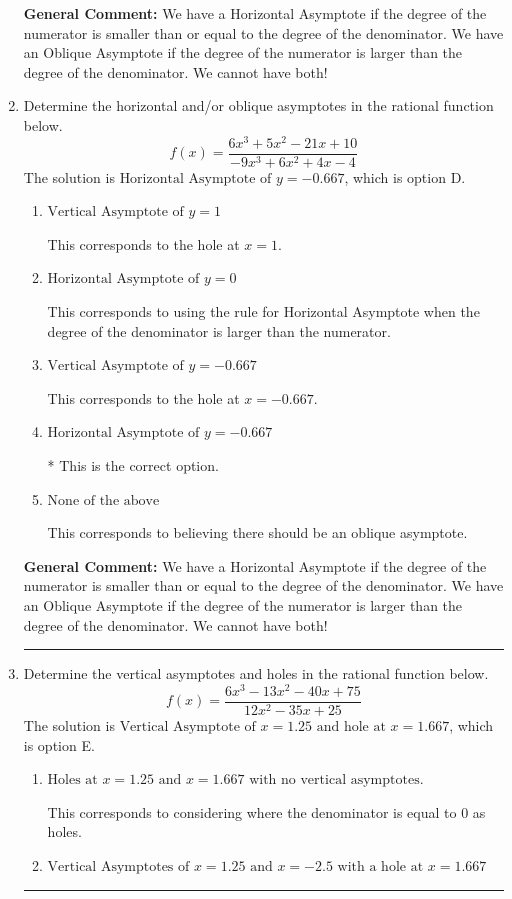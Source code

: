 \documentclass{extbook}[14pt]
\newcommand{\litem}[1]{\item #1

\rule{\textwidth}{0.4pt}}
\begin{document}
\begin{enumerate}
{\textbf{General Comment:} We have a Horizontal Asymptote if the degree of the numerator is smaller than or equal to the degree of the denominator. We have an Oblique Asymptote if the degree of the numerator is larger than the degree of the denominator. We cannot have both!
}
\litem{
Determine the horizontal and/or oblique asymptotes in the rational function below.
\[ f(x) = \frac{6x^{3} +5 x^{2} -21 x + 10}{-9x^{3} +6 x^{2} +4 x -4} \]The solution is \( \text{Horizontal Asymptote of } y = -0.667  \), which is option D.\begin{enumerate}[label=\Alph*.]
\item \( \text{Vertical Asymptote of } y = 1  \)

This corresponds to the hole at $x = 1$.
\item \( \text{Horizontal Asymptote of } y = 0  \)

This corresponds to using the rule for Horizontal Asymptote when the degree of the denominator is larger than the numerator.
\item \( \text{Vertical Asymptote of } y = -0.667  \)

This corresponds to the hole at $x = -0.667$.
\item \( \text{Horizontal Asymptote of } y = -0.667  \)

* This is the correct option.
\item \( \text{None of the above} \)

This corresponds to believing there should be an oblique asymptote.
\end{enumerate}

\textbf{General Comment:} We have a Horizontal Asymptote if the degree of the numerator is smaller than or equal to the degree of the denominator. We have an Oblique Asymptote if the degree of the numerator is larger than the degree of the denominator. We cannot have both!
}
\litem{
Determine the vertical asymptotes and holes in the rational function below.
\[ f(x) = \frac{6x^{3} -13 x^{2} -40 x + 75}{12x^{2} -35 x + 25} \]The solution is \( \text{Vertical Asymptote of } x = 1.25 \text{ and hole at } x = 1.667 \), which is option E.\begin{enumerate}[label=\Alph*.]
\item \( \text{Holes at } x = 1.25 \text{ and } x = 1.667 \text{ with no vertical asymptotes.} \)

This corresponds to considering where the denominator is equal to 0 as holes.
\item \( \text{Vertical Asymptotes of } x = 1.25 \text{ and } x = -2.5 \text{ with a hole at } x = 1.667 \)


\end{enumerate}}
\end{enumerate}
\end{document}
